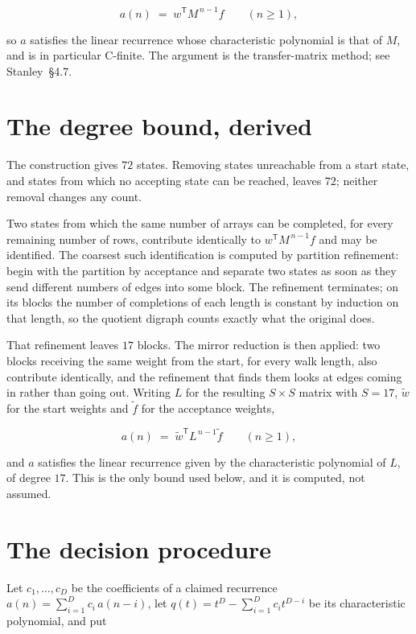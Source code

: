 \documentclass[11pt]{article}
\theoremstyle{definition}
\begin{document}
\[a(n) \;=\; w^{\mathsf T} M^{\,n-1} f \qquad (n \ge 1),\]

so $a$ satisfies the linear recurrence whose characteristic polynomial is that of $M$, and is in particular C-finite. The argument is the transfer-matrix method; see Stanley~\S4.7.

\section{The degree bound, derived}

The construction gives $72$ states. Removing states unreachable from a start state, and states from which no accepting state can be reached, leaves $72$; neither removal changes any count.

Two states from which the same number of arrays can be completed, for every remaining number of rows, contribute identically to $w^{\mathsf T}M^{\,n-1}f$ and may be identified. The coarsest such identification is computed by partition refinement: begin with the partition by acceptance and separate two states as soon as they send different numbers of edges into some block. The refinement terminates; on its blocks the number of completions of each length is constant by induction on that length, so the quotient digraph counts exactly what the original does.

That refinement leaves $17$ blocks. The mirror reduction is then applied: two blocks receiving the same weight from the start, for every walk length, also contribute identically, and the refinement that finds them looks at edges coming in rather than going out. Writing $L$ for the resulting $S \times S$ matrix with $S = 17$, $\tilde w$ for the start weights and $\tilde f$ for the acceptance weights,

\[a(n) \;=\; \tilde w^{\mathsf T} L^{\,n-1} \tilde f \qquad (n \ge 1),\]

and $a$ satisfies the linear recurrence given by the characteristic polynomial of $L$, of degree $17$. This is the only bound used below, and it is computed, not assumed.

\section{The decision procedure}

Let $c_1,\dots,c_D$ be the coefficients of a claimed recurrence $a(n) = \sum_{i=1}^{D} c_i\,a(n-i)$, let $q(t) = t^{D} - \sum_{i=1}^{D} c_i t^{D-i}$ be its characteristic polynomial, and put
\end{document}
